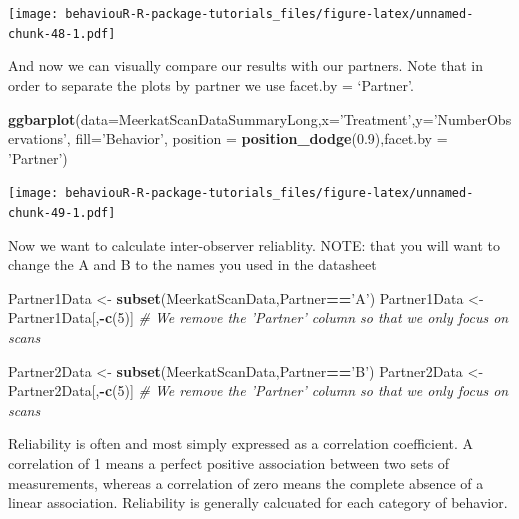 \documentclass[]{book}
\newenvironment{Shaded}{\begin{snugshade}}{\end{snugshade}}
\newcommand{\CommentTok}[1]{\textcolor[rgb]{0.56,0.35,0.01}{\textit{#1}}}
\newcommand{\DataTypeTok}[1]{\textcolor[rgb]{0.13,0.29,0.53}{#1}}
\newcommand{\DecValTok}[1]{\textcolor[rgb]{0.00,0.00,0.81}{#1}}
\newcommand{\FloatTok}[1]{\textcolor[rgb]{0.00,0.00,0.81}{#1}}
\newcommand{\KeywordTok}[1]{\textcolor[rgb]{0.13,0.29,0.53}{\textbf{#1}}}
\newcommand{\NormalTok}[1]{#1}
\newcommand{\OperatorTok}[1]{\textcolor[rgb]{0.81,0.36,0.00}{\textbf{#1}}}
\newcommand{\StringTok}[1]{\textcolor[rgb]{0.31,0.60,0.02}{#1}}
\begin{document}
\texttt{[image: behaviouR-R-package-tutorials\_files/figure-latex/unnamed-chunk-48-1.pdf]}

And now we can visually compare our results with our partners. Note that in order to separate the plots by partner we use facet.by = `Partner'.

\begin{Shaded}
\begin{Highlighting}[]
\KeywordTok{ggbarplot}\NormalTok{(}\DataTypeTok{data=}\NormalTok{MeerkatScanDataSummaryLong,}\DataTypeTok{x=}\StringTok{'Treatment'}\NormalTok{,}\DataTypeTok{y=}\StringTok{'NumberObservations'}\NormalTok{, }\DataTypeTok{fill=}\StringTok{'Behavior'}\NormalTok{,}
          \DataTypeTok{position =} \KeywordTok{position_dodge}\NormalTok{(}\FloatTok{0.9}\NormalTok{),}\DataTypeTok{facet.by =} \StringTok{'Partner'}\NormalTok{)}
\end{Highlighting}
\end{Shaded}

\texttt{[image: behaviouR-R-package-tutorials\_files/figure-latex/unnamed-chunk-49-1.pdf]}

Now we want to calculate inter-observer reliablity.
NOTE: that you will want to change the A and B to the names you used in the datasheet

\begin{Shaded}
\begin{Highlighting}[]
\NormalTok{Partner1Data <-}\StringTok{ }\KeywordTok{subset}\NormalTok{(MeerkatScanData,Partner}\OperatorTok{==}\StringTok{'A'}\NormalTok{)}
\NormalTok{Partner1Data <-}\StringTok{ }\NormalTok{Partner1Data[,}\OperatorTok{-}\KeywordTok{c}\NormalTok{(}\DecValTok{5}\NormalTok{)] }\CommentTok{# We remove the 'Partner' column so that we only focus on scans}

\NormalTok{Partner2Data <-}\StringTok{ }\KeywordTok{subset}\NormalTok{(MeerkatScanData,Partner}\OperatorTok{==}\StringTok{'B'}\NormalTok{)}
\NormalTok{Partner2Data <-}\StringTok{ }\NormalTok{Partner2Data[,}\OperatorTok{-}\KeywordTok{c}\NormalTok{(}\DecValTok{5}\NormalTok{)] }\CommentTok{# We remove the 'Partner' column so that we only focus on scans}
\end{Highlighting}
\end{Shaded}

Reliability is often and most simply expressed as a correlation coefficient. A correlation of 1 means a perfect positive association between two sets of measurements, whereas a correlation of zero means the complete absence of a linear association. Reliability is generally calcuated for each category of behavior.
\end{document}
